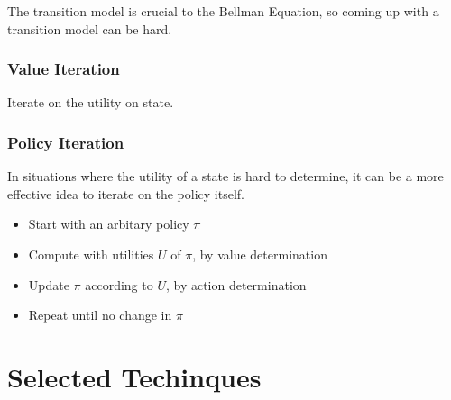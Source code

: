 \documentclass[a4paper]{article}
\begin{document}
The transition model is crucial to the Bellman Equation, so coming up with a transition model can be hard.

\subsubsection{Value Iteration}
Iterate on the utility on state.

\subsubsection{Policy Iteration}
In situations where the utility of a state is hard to determine, it can be a more effective idea to iterate on the policy itself.

\begin{itemize}
    \item Start with an arbitary policy $\pi$
    \item Compute with utilities $U$ of $\pi$, by value determination
    \item Update $\pi$ according to $U$, by action determination
    \item Repeat until no change in $\pi$
\end{itemize}

\section{Selected Techinques}



\end{document}
